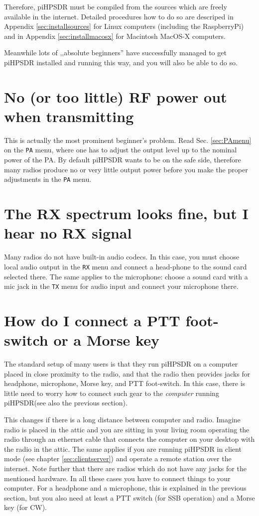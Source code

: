 \documentclass[12pt]{book}
\def\bltt#1{\texttt{\color{blue}#1}}
\def\pH{pi\-HPSDR\xspace}
\begin{document}
Therefore, \pH must be compiled from the sources which are freely available in the internet. Detailed
procedures how to do so are descriped in Appendix \ref{sec:installsources} for Linux computers
(including the RaspberryPi) and in Appendix \ref{sec:installmacosx} for Macintosh MacOS-X computers.

Meanwhile lots of ,,absolute beginners'' have successfully managed to get \pH installed and running
this way, and you will also be able to do so.

\section{No (or too little) RF power out when transmitting}
This is actually the most prominent beginner's problem. Read Sec. \ref{sec:PAmenu} on the \bltt{PA} menu,
where one has to adjust the output level up to the nominal power of the PA. By default \pH wants to
be on the safe side, therefore many radios produce no or very little output power before you make
the proper adjustments in the \bltt{PA} menu.


\section{The RX spectrum looks fine, but I hear no RX signal}
Many radios do not have built-in audio codecs. In this case, you must choose local audio output in
the \bltt{RX} menu and connect a head-phone to the sound card selected there. The same applies to
the microphone: choose a sound card with a mic jack in the \bltt{TX} menu for audio input and connect
your microphone there.

\section{How do I connect a PTT foot-switch or a Morse key}
The standard setup of many users is that they run \pH on a computer placed in close proximity to the
radio, and that the radio then provides jacks for headphone, microphone, Morse key, and PTT foot-switch.
In this case, there is little need to worry how to connect such gear to the \textit{computer} running
\pH (see also the previous section).

This changes if there is a long distance between computer and radio. Imagine radio is placed in the attic
and you are sitting in your living room operating the radio through an ethernet cable that connects the
computer on your desktop with the radio in the attic. The same applies if you are running \pH in client
mode (see chapter \ref{sec:clientserver}) and operate a remote station over the internet. Note further
that there are radios which do not have any jacks for the mentioned hardware. In all these cases you have
to connect things to your computer. For a headphone and a microphone, this is explained in the previous
section, but you also need at least a PTT switch (for SSB operation) and a Morse key (for CW).
\end{document}
